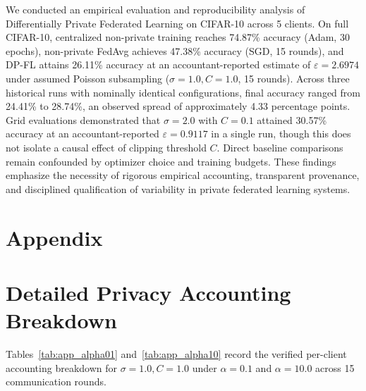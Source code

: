 \documentclass[11pt,a4paper]{article}
\begin{document}
We conducted an empirical evaluation and reproducibility analysis of Differentially Private Federated Learning on CIFAR-10 across 5 clients. On full CIFAR-10, centralized non-private training reaches 74.87\% accuracy (Adam, 30 epochs), non-private FedAvg achieves 47.38\% accuracy (SGD, 15 rounds), and DP-FL attains 26.11\% accuracy at an accountant-reported estimate of $\varepsilon=2.6974$ under assumed Poisson subsampling ($\sigma=1.0, C=1.0$, 15 rounds). Across three historical runs with nominally identical configurations, final accuracy ranged from 24.41\% to 28.74\%, an observed spread of approximately 4.33 percentage points. Grid evaluations demonstrated that $\sigma=2.0$ with $C=0.1$ attained 30.57\% accuracy at an accountant-reported $\varepsilon=0.9117$ in a single run, though this does not isolate a causal effect of clipping threshold $C$. Direct baseline comparisons remain confounded by optimizer choice and training budgets. These findings emphasize the necessity of rigorous empirical accounting, transparent provenance, and disciplined qualification of variability in private federated learning systems.

\clearpage
\appendix
\section*{Appendix}

\section{Detailed Privacy Accounting Breakdown}

Tables~\ref{tab:app_alpha01} and~\ref{tab:app_alpha10} record the verified per-client accounting breakdown for $\sigma=1.0, C=1.0$ under $\alpha=0.1$ and $\alpha=10.0$ across 15 communication rounds.

\begin{table}[htbp]
    \centering
    \caption{Per-client accounting breakdown for $\alpha=0.1, \sigma=1.0, C=1.0$, seed 42 (15 rounds). Client 4 determines global privacy ($\varepsilon_{\text{global}}=2.6974$) due to its highest sampling rate, while Client 0 executed the most physical steps ($T_0=3,045$).}
    \label{tab:app_alpha01}
\end{table}
\end{document}
